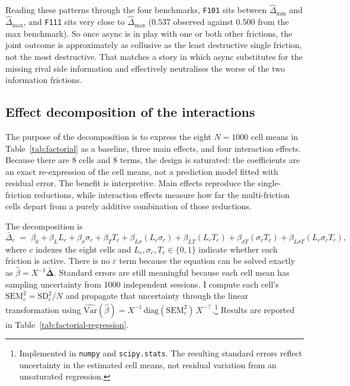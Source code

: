 Reading these patterns through the four benchmarks, \texttt{F101} sits between $\widehat\Delta_{\mathrm{min}}$ and $\widehat\Delta_{\mathrm{max}}$, and \texttt{F111} sits very close to $\widehat\Delta_{\mathrm{max}}$ ($0.537$ observed against $0.500$ from the max benchmark). So once async is in play with one or both other frictions, the joint outcome is approximately as collusive as the least destructive single friction, not the most destructive. That matches a story in which async substitutes for the missing rival side information and effectively neutralises the worse of the two information frictions.


\subsection{Effect decomposition of the interactions}
\label{sec:factorial-regression}

The purpose of the decomposition is to express the eight $N=1000$ cell means in Table~\ref{tab:factorial} as a baseline, three main effects, and four interaction effects. Because there are 8 cells and 8 terms, the design is saturated: the coefficients are an exact re-expression of the cell means, not a prediction model fitted with residual error. The benefit is interpretive. Main effects reproduce the single-friction reductions, while interaction effects measure how far the multi-friction cells depart from a purely additive combination of those reductions.

The decomposition is
\begin{equation*}
\bar{\Delta}_c \;=\; \beta_0 + \beta_L L_c + \beta_\sigma \sigma_c + \beta_T T_c + \beta_{L\sigma}(L_c\sigma_c) + \beta_{LT}(L_cT_c) + \beta_{\sigma T}(\sigma_cT_c) + \beta_{L\sigma T}(L_c\sigma_cT_c),
\end{equation*}
where $c$ indexes the eight cells and $L_c,\sigma_c,T_c\in\{0,1\}$ indicate whether each friction is active. There is no $\varepsilon$ term because the equation can be solved exactly as $\hat\beta = X^{-1}\bar{\boldsymbol\Delta}$. Standard errors are still meaningful because each cell mean has sampling uncertainty from 1000 independent sessions. I compute each cell's $\mathrm{SEM}_c^2 = \mathrm{SD}_c^2 / N$ and propagate that uncertainty through the linear transformation using $\widehat{\mathrm{Var}}(\hat\beta) = X^{-1}\,\mathrm{diag}(\mathrm{SEM}_c^2)\,X^{-\top}$.\footnote{Implemented in \texttt{numpy} and \texttt{scipy.stats}. The resulting standard errors reflect uncertainty in the estimated cell means, not residual variation from an unsaturated regression.} Results are reported in Table~\ref{tab:factorial-regression}.

